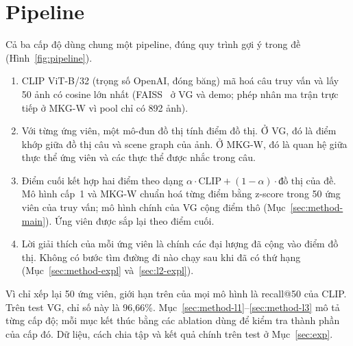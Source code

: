 \section{Pipeline}
\label{sec:pipeline}

Cả ba cấp độ dùng chung một pipeline, đúng quy trình gợi ý trong đề (Hình~\ref{fig:pipeline}).
\begin{enumerate}
\item CLIP ViT-B/32 (trọng số OpenAI, đóng băng) mã hoá câu truy vấn và lấy 50 ảnh có cosine lớn nhất (FAISS~\cite{johnson2019faiss}
ở VG và demo; phép nhân ma trận trực tiếp ở MKG-W vì pool chỉ có 892 ảnh).
\item Với từng ứng viên, một mô-đun đồ thị tính điểm đồ thị. Ở VG, đó là điểm khớp giữa đồ thị câu và scene graph của ảnh.
Ở MKG-W, đó là quan hệ giữa thực thể ứng viên và các thực thể được nhắc trong câu.
\item Điểm cuối kết hợp hai điểm theo dạng $\alpha\cdot\text{CLIP} + (1-\alpha)\cdot\text{đồ thị}$ của đề. Mô hình cấp~1
và MKG-W chuẩn hoá từng điểm bằng z-score trong 50 ứng viên của truy vấn; mô hình chính của VG cộng điểm thô
(Mục~\ref{sec:method-main}). Ứng viên được sắp lại theo điểm cuối.
\item Lời giải thích của mỗi ứng viên là chính các đại lượng đã cộng vào điểm đồ thị. Không có bước tìm đường đi nào chạy
sau khi đã có thứ hạng (Mục~\ref{sec:method-expl} và~\ref{sec:l2-expl}).
\end{enumerate}
Vì chỉ xếp lại 50 ứng viên, giới hạn trên của mọi mô hình là recall@50 của CLIP. Trên test VG, chỉ số này là 96,66\%.
Mục~\ref{sec:method-l1}--\ref{sec:method-l3} mô tả từng cấp độ; mỗi mục kết thúc bằng các ablation dùng để kiểm tra
thành phần của cấp đó. Dữ liệu, cách chia tập và kết quả chính trên test ở Mục~\ref{sec:exp}.

